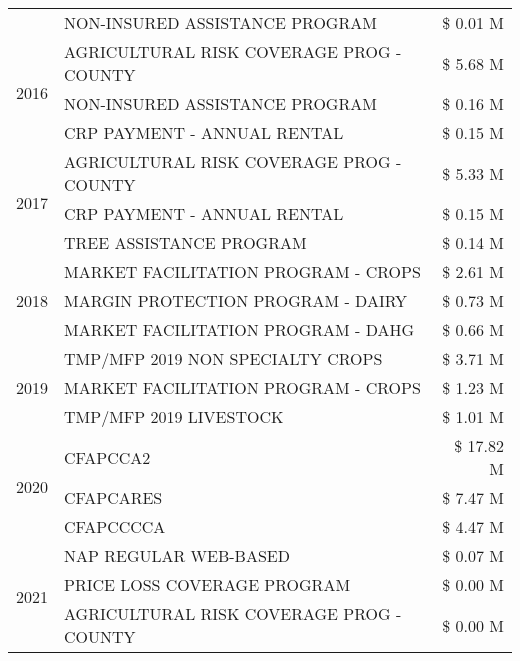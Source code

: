 \begin{tabular}{llr}
 & NON-INSURED ASSISTANCE PROGRAM & \$ 0.01 M \\
\cline{1-3}
\multirow[t]{3}{*}{2016} & AGRICULTURAL RISK COVERAGE PROG - COUNTY & \$ 5.68 M \\
 & NON-INSURED ASSISTANCE PROGRAM & \$ 0.16 M \\
 & CRP PAYMENT - ANNUAL RENTAL & \$ 0.15 M \\
\cline{1-3}
\multirow[t]{3}{*}{2017} & AGRICULTURAL RISK COVERAGE PROG - COUNTY & \$ 5.33 M \\
 & CRP PAYMENT - ANNUAL RENTAL & \$ 0.15 M \\
 & TREE ASSISTANCE PROGRAM & \$ 0.14 M \\
\cline{1-3}
\multirow[t]{3}{*}{2018} & MARKET FACILITATION PROGRAM - CROPS & \$ 2.61 M \\
 & MARGIN PROTECTION PROGRAM - DAIRY & \$ 0.73 M \\
 & MARKET FACILITATION PROGRAM - DAHG & \$ 0.66 M \\
\cline{1-3}
\multirow[t]{3}{*}{2019} & TMP/MFP 2019 NON SPECIALTY CROPS & \$ 3.71 M \\
 & MARKET FACILITATION PROGRAM - CROPS & \$ 1.23 M \\
 & TMP/MFP 2019 LIVESTOCK & \$ 1.01 M \\
\cline{1-3}
\multirow[t]{3}{*}{2020} & CFAPCCA2 & \$ 17.82 M \\
 & CFAPCARES & \$ 7.47 M \\
 & CFAPCCCCA & \$ 4.47 M \\
\cline{1-3}
\multirow[t]{3}{*}{2021} & NAP REGULAR WEB-BASED & \$ 0.07 M \\
 & PRICE LOSS COVERAGE PROGRAM & \$ 0.00 M \\
 & AGRICULTURAL RISK COVERAGE PROG - COUNTY & \$ 0.00 M \\
\cline{1-3}
\bottomrule
\end{tabular}
